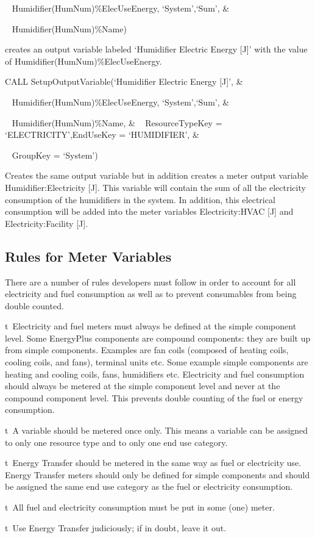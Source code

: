 ~ Humidifier(HumNum)\%ElecUseEnergy, `System',`Sum', \&

~ Humidifier(HumNum)\%Name)

creates an output variable labeled `Humidifier Electric Energy {[}J{]}' with the value of Humidifier(HumNum)\%ElecUseEnergy.

CALL SetupOutputVariable(`Humidifier Electric Energy {[}J{]}', \&

~ Humidifier(HumNum)\%ElecUseEnergy, `System',`Sum', \&

~ Humidifier(HumNum)\%Name, \& ~ ResourceTypeKey = `ELECTRICITY',EndUseKey = `HUMIDIFIER', \&

~ GroupKey = `System')

Creates the same output variable but in addition creates a meter output variable Humidifier:Electricity {[}J{]}. This variable will contain the sum of all the electricity consumption of the humidifiers in the system. In addition, this electrical consumption will be added into the meter variables Electricity:HVAC {[}J{]} and Electricity:Facility {[}J{]}.

\subsection{Rules for Meter Variables}\label{rules-for-meter-variables}

There are a number of rules developers must follow in order to account for all electricity and fuel consumption as well as to prevent consumables from being double counted.

t~Electricity and fuel meters must always be defined at the simple component level. Some EnergyPlus components are compound components: they are built up from simple components. Examples are fan coils (composed of heating coils, cooling coils, and fans), terminal units etc. Some example simple components are heating and cooling coils, fans, humidifiers etc. Electricity and fuel consumption should always be metered at the simple component level and never at the compound component level. This prevents double counting of the fuel or energy consumption.

t~A variable should be metered once only. This means a variable can be assigned to only one resource type and to only one end use category.

t~Energy Transfer should be metered in the same way as fuel or electricity use. Energy Transfer meters should only be defined for simple components and should be assigned the same end use category as the fuel or electricity consumption.

t~All fuel and electricity consumption must be put in some (one) meter.

t~Use Energy Transfer judiciously; if in doubt, leave it out.
